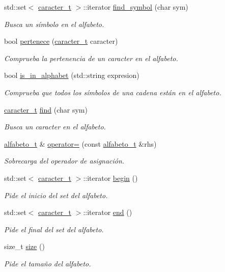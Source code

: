 \begin{DoxyCompactItemize}
std\+::set$<$ \hyperlink{classcaracter__t}{caracter\+\_\+t} $>$\+::iterator \hyperlink{classalfabeto__t_a161c66c238d75e8ae563f273315ae377}{find\+\_\+symbol} (char sym)
\begin{DoxyCompactList}\small\item\em Busca un símbolo en el alfabeto. \end{DoxyCompactList}\item 
bool \hyperlink{classalfabeto__t_aa9a6528f5c910f2e68e658606b541a19}{pertenece} (\hyperlink{classcaracter__t}{caracter\+\_\+t} caracter)
\begin{DoxyCompactList}\small\item\em Comprueba la pertenencia de un caracter en el alfabeto. \end{DoxyCompactList}\item 
bool \hyperlink{classalfabeto__t_a62cded4fe4f780d6b13fe9d4d9c40c14}{is\+\_\+in\+\_\+alphabet} (std\+::string expresion)
\begin{DoxyCompactList}\small\item\em Comprueba que todos los símbolos de una cadena están en el alfabeto. \end{DoxyCompactList}\item 
\hyperlink{classcaracter__t}{caracter\+\_\+t} \hyperlink{classalfabeto__t_aca1176f138d0641e5dc46b6bc87ddbce}{find} (char sym)
\begin{DoxyCompactList}\small\item\em Busca un caracter en el alfabeto. \end{DoxyCompactList}\item 
\hyperlink{classalfabeto__t}{alfabeto\+\_\+t} \& \hyperlink{classalfabeto__t_abcd2337bc32e65f65f39c02153d80a79}{operator=} (const \hyperlink{classalfabeto__t}{alfabeto\+\_\+t} \&rhs)
\begin{DoxyCompactList}\small\item\em Sobrecarga del operador de asignación. \end{DoxyCompactList}\item 
std\+::set$<$ \hyperlink{classcaracter__t}{caracter\+\_\+t} $>$\+::iterator \hyperlink{classalfabeto__t_a5c28110007c439f8caff59c129ccee5c}{begin} ()
\begin{DoxyCompactList}\small\item\em Pide el inicio del set del alfabeto. \end{DoxyCompactList}\item 
std\+::set$<$ \hyperlink{classcaracter__t}{caracter\+\_\+t} $>$\+::iterator \hyperlink{classalfabeto__t_a696e28d37a296c4160de83348a84846b}{end} ()
\begin{DoxyCompactList}\small\item\em Pide el final del set del alfabeto. \end{DoxyCompactList}\item 
size\+\_\+t \hyperlink{classalfabeto__t_a9eb89f75097160392ea8bbbdb9783e6b}{size} ()
\begin{DoxyCompactList}\small\item\em Pide el tamaño del alfabeto. \end{DoxyCompactList}\end{DoxyCompactItemize}


